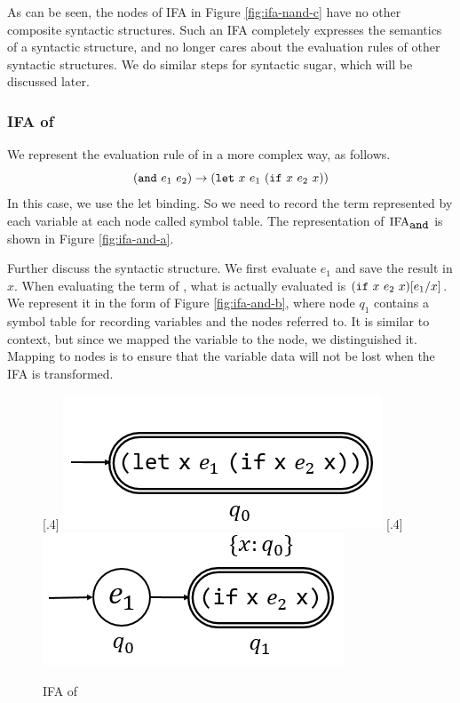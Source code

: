 As can be seen, the nodes of IFA in Figure \ref{fig:ifa-nand-c} have no other composite syntactic structures. Such an IFA completely expresses the semantics of a syntactic structure, and no longer cares about the evaluation rules of other syntactic structures. We do similar steps for syntactic sugar, which will be discussed later.

\subsubsection{IFA of }

We represent the evaluation rule of  in a more complex way, as follows. 
\[
(\mbox{\tt and}~e_1~e_2) \to (\mbox{\tt let}~x~e_1~(\mbox{\tt if}~x~e_2~x))
\]
In this case, we use the let binding. So we need to record the term represented by each variable at each node called symbol table. The representation of $\text{IFA}_{\mbox{\tt and}}$ is shown in Figure \ref{fig:ifa-and-a}. 

Further discuss the syntactic structure. We first evaluate $e_1$ and save the result in $x$. When evaluating the term of , what is actually evaluated is $(\mbox{\tt if}~x~e_2~x)[e_1/x]$. We represent it in the form of Figure \ref{fig:ifa-and-b}, where node $q_1$ contains a symbol table for recording variables and the nodes referred to. It is similar to context, but since we mapped the variable to the node, we distinguished it. Mapping to nodes is to ensure that the variable data will not be lost when the IFA is transformed.

\begin{figure}[t]
\centering
{}[.4\linewidth]{
    \includegraphics[scale=0.25]{images/ifa/ifa-and-1.png}
}
[.4\linewidth]{
    \includegraphics[scale=0.25]{images/ifa/ifa-and-2.png}
}
\caption{IFA of }
\label{fig:ifa-and}
\end{figure}

